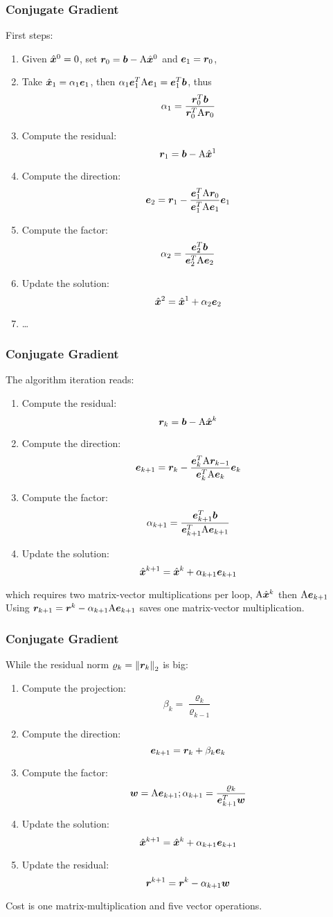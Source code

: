 \begin{frame}
  \frametitle{Conjugate Gradient}

First steps:
\begin{enumerate}
\item Given $\hx^0 = 0$, set $\rr_0 = \bb - \mA \hx^0$ and $\ee_1 = \rr_0$,
\item Take $\hx_1 = \alpha_1 \ee_1$, then $\alpha_1\ee_1^T \mA \ee_1 = \ee_1^T \bb$, thus
\[
\alpha_1 = \frac{\rr^T_0\bb}{\rr^T_0\mA\rr_0}
\]
\item Compute the residual:
\[
\rr_1 = \bb - \mA \hx^1
\]
\item Compute the direction:
\[
\ee_{2} = \rr_1 - \frac{\ee^T_1\mA\rr_{0}}{\ee^T_1\mA\ee_1}\ee_{1}
\]
\item Compute the factor:
\[
\alpha_2 = \frac{\ee^T_2\bb}{\ee^T_2\mA\ee_2}
\]
\item Update the solution:
\[
\hx^2 = \hx^1 + \alpha_2 \ee_2
\]
\item \dots
\end{enumerate}

\end{frame}

\begin{frame}
  \frametitle{Conjugate Gradient}

The algorithm iteration reads:
\begin{enumerate}
\item Compute the residual:
\[
\rr_k = \bb - \mA \hx^{k}
\]
\item Compute the direction:
\[
\ee_{k+1} = \rr_k - \frac{\ee^T_{k}\mA\rr_{k-1}}{\ee^T_k\mA\ee_k}\ee_k
\]
\item Compute the factor:
\[
\alpha_{k+1} = \frac{\ee^T_{k+1}\bb}{\ee^T_{k+1}\mA\ee_{k+1}}
\]
\item Update the solution:
\[
\hx^{k+1} = \hx^k + \alpha_{k+1} \ee_{k+1}
\]\end{enumerate}
which requires two matrix-vector multiplications per loop, $\mA\hx^{k}$ then $\mA\ee_{k+1}$
Using $\rr_{k+1} = \rr^k - \alpha_{k+1}\mA\ee_{k+1}$ saves one matrix-vector multiplication.

\end{frame}

\begin{frame}
  \frametitle{Conjugate Gradient}

While the residual norm $\varrho_k = \norm{\rr_k}_2$ is big:
\begin{enumerate}
\item Compute the projection:
\[
\beta_k = \frac{\varrho_k}{\varrho_{k-1}}
\]
\item Compute the direction:
\[
\ee_{k+1} = \rr_k + \beta_k\ee_k
\]
\item Compute the factor:
\[
\ww = \mA\ee_{k+1}; \alpha_{k+1} = \frac{\varrho_k}{\ee^T_{k+1}\ww}
\]
\item Update the solution:
\[
\hx^{k+1} = \hx^k + \alpha_{k+1} \ee_{k+1}
\]
\item Update the residual:
\[
\rr^{k+1} = \rr^k - \alpha_{k+1} \ww
\]
\end{enumerate}
Cost is one matrix-multiplication and five vector operations.

\end{frame}

